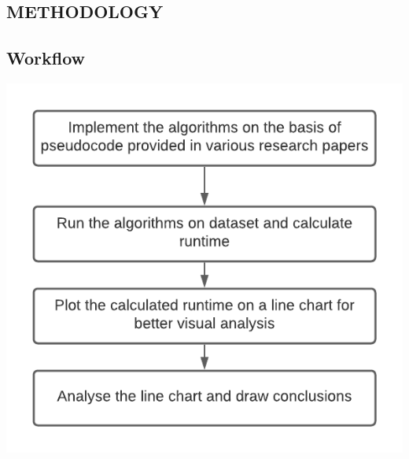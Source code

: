 \documentclass[a4paper, 12pt]{article}
\begin{document}

\newpage
\begin{center}
\section{METHODOLOGY}

\end{center}
\subsection{Workflow}
\includegraphics[width=400pt]{work-flow.png}

\newpage
\end{document}
